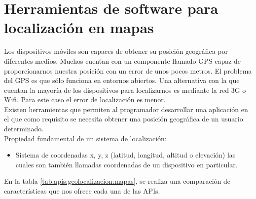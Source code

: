 %

\section{Herramientas de software para localización en mapas}

Los dispositivos móviles son capaces de obtener su posición geográfica por 
diferentes medios. Muchos cuentan con un componente llamado GPS capaz de 
proporcionarnos nuestra posición con un error de unos pocos metros. El problema 
del GPS es que sólo funciona en entornos abiertos. Una alternativa  con la que 
cuentan la mayoría de los dispositivos para localizarnos es mediante la red 3G o 
Wifi. Para este caso el error de localización es menor. \\
Existen herramientas que permiten al programador desarrollar una aplicación en 
el que como requisito se necesita obtener una posición geográfica de un usuario 
determinado. \\

Propiedad fundamental de un sistema de localización:
\begin{itemize}
	\item Sistema de coordenadas x, y, z (latitud, longitud, altitud o 
	elevación) las cuales son también llamadas coordenadas de un dispositivo 
	en particular.
\end{itemize}

En la tabla \ref{tab:apis:geolocalizacion:mapas}, se realiza una 
comparación de características que nos ofrece cada una de las APIs.


